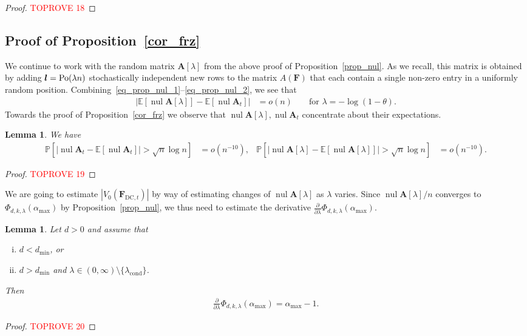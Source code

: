 \documentclass[10pt,reqno]{amsart}
\numberwithin{equation}{section}
\renewcommand{\vec}[1]{\boldsymbol{#1}}
\newcommand\dmin{d_{\mathrm{min}}}
\newcommand{\FDC}[1]{\PHI_{\mathrm{DC},{#1}}}
\newcommand{\amax}{\alpha_{\max}}
\newcommand{\lcond}{\lambda_{\mathrm{cond}}}
\newcommand\PHI{\vec F}
\newcommand\vA{\vec A}
\newcommand\vl{\vec l}
\newcommand\Erw{\mathbb{E}}
\newcommand\ex{\Erw}
\newcommand{\Po}{{\rm Po}}
\newcommand\brk[1]{\left\lbrack{#1}\right\rbrack}
\newcommand\abs[1]{\left|{#1}\right|}
\newcommand\pr{\mathbb{P}}
\newcommand\Prop{Proposition}
\newtheorem{lemma}[definition]{Lemma}
\DeclareMathOperator{\nul}{nul}
\def\pr{{\mathbb P}}
\newcommand{\Ph}{\Phi_{d,k,\lambda}}
\begin{document}
\begin{proof}\textcolor{red}{TOPROVE 18}\end{proof}


\subsection{Proof of \Prop~\ref{cor_frz}}\label{sec_cor_frz}
We continue to work with the random matrix $\vA[\lambda]$ from the above proof of \Prop~\ref{prop_nul}.
As we recall, this matrix is obtained by adding $\vl=\Po(\lambda n)$ stochastically independent new rows to the matrix $A(\PHI)$ that each contain a single non-zero entry in a uniformly random position.
Combining~\eqref{eq_prop_nul_1}--\eqref{eq_prop_nul_2}, we see that
\begin{align}\label{eqAA}
	\abs{\ex[\nul\vA[\lambda]]-\ex[\nul\vA_t]}&=o(n)&&\mbox{ for }\lambda=-\log(1-\theta).
\end{align}
Towards the proof of \Prop~\ref{cor_frz} we observe that $\nul\vA[\lambda],\nul\vA_t$ concentrate about their expectations.

\begin{lemma}\label{cor_nul}
	We have 
	\begin{align}\label{eq_cor_nul}
		\pr\brk{|\nul\vA_t-\ex[\nul\vA_t]|>\sqrt n\log n}&=o(n^{-10}),&
		\pr\brk{|\nul\vA\brk\lambda-\ex[\nul\vA\brk\lambda]|>\sqrt n\log n}&=o(n^{-10}).
	\end{align}
\end{lemma}
\begin{proof}\textcolor{red}{TOPROVE 19}\end{proof}




We are going to estimate $|V_0(\FDC t)|$ by way of estimating changes of $\nul\vA[\lambda]$ as $\lambda$ varies.
Since $\nul\vA[\lambda]/n$ converges to $\Ph(\amax)$ by \Prop~\ref{prop_nul}, we thus need to estimate the derivative $\frac\partial{\partial\lambda}\Ph(\amax)$.

\begin{lemma}\label{lem_nul}
	Let $d>0$ and assume that
	\begin{enumerate}[(i)]
		\item $d<\dmin$, or
		\item $d>\dmin$ and $\lambda\in(0,\infty)\setminus\{\lcond\}$.
	\end{enumerate}
Then
\begin{align}\label{eqlem_nul}
	\frac{\partial}{\partial\lambda}\Phi_{d,k,\lambda}(\amax)=\amax-1.
\end{align}
\end{lemma}
\begin{proof}\textcolor{red}{TOPROVE 20}\end{proof}
\end{document}
